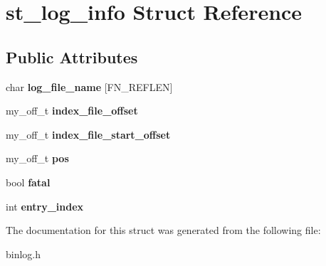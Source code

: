 \hypertarget{structst__log__info}{}\section{st\+\_\+log\+\_\+info Struct Reference}
\label{structst__log__info}
\subsection*{Public Attributes}
\begin{DoxyCompactItemize}
\item 
\mbox{\label{structst__log__info_ad352ce5b8eeceebb7be69dc42f1e10b5}} 
char {\bfseries log\+\_\+file\+\_\+name} \mbox{[}F\+N\+\_\+\+R\+E\+F\+L\+EN\mbox{]}
\item 
\mbox{\label{structst__log__info_a71cc44d914033e9b9d35fe9ec02a0843}} 
my\+\_\+off\+\_\+t {\bfseries index\+\_\+file\+\_\+offset}
\item 
\mbox{\label{structst__log__info_a6453652613f7c2cca3ba7043f4d9b506}} 
my\+\_\+off\+\_\+t {\bfseries index\+\_\+file\+\_\+start\+\_\+offset}
\item 
\mbox{\label{structst__log__info_a7d9829c24b0bf752893266fd6e078b8a}} 
my\+\_\+off\+\_\+t {\bfseries pos}
\item 
\mbox{\label{structst__log__info_a631795832ba046c0752ba06cc91b3a3d}} 
bool {\bfseries fatal}
\item 
\mbox{\label{structst__log__info_a92099fc3ce54e7faaa11c3edb0cc262c}} 
int {\bfseries entry\+\_\+index}
\end{DoxyCompactItemize}


The documentation for this struct was generated from the following file\+:\begin{DoxyCompactItemize}
\item 
binlog.\+h\end{DoxyCompactItemize}
